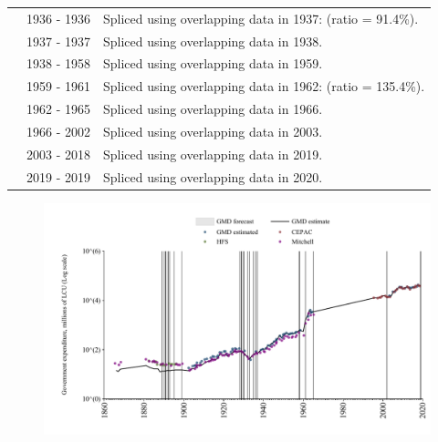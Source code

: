 \documentclass[12pt,a4paper,landscape]{article}
\begin{document}
\begin{adjustbox}{max totalsize={\paperwidth}{\paperheight},center}
\begin{minipage}[t][\textheight][t]{\textwidth}
\begin{table}[H]
\begin{tabular}{|l|l|l|}
\rowcolor{lightgray}\cite{GMD_estimated}& 1936 - 1936 &Spliced using overlapping data in 1937: (ratio = 91.4\%). \\
\rowcolor{white}\cite{Mitchell}& 1937 - 1937 &Spliced using overlapping data in 1938. \\
\rowcolor{lightgray}\cite{GMD_estimated}& 1938 - 1958 &Spliced using overlapping data in 1959. \\
\rowcolor{white}\cite{Mitchell}& 1959 - 1961 &Spliced using overlapping data in 1962: (ratio = 135.4\%). \\
\rowcolor{lightgray}\cite{GMD_estimated}& 1962 - 1965 &Spliced using overlapping data in 1966. \\
\rowcolor{white}\cite{CEPAC}& 1966 - 2002 &Spliced using overlapping data in 2003. \\
\rowcolor{lightgray}\cite{GMD_estimated}& 2003 - 2018 &Spliced using overlapping data in 2019. \\
\rowcolor{white}\cite{CEPAC}& 2019 - 2019 &Spliced using overlapping data in 2020. \\
\hline
\end{tabular}
\end{table}
\begin{figure}[H]
\centering
\includegraphics[width=\textwidth,height=0.6\textheight,keepaspectratio]{graphs/CUB_govexp.pdf}
\end{figure}
\end{minipage}
\end{adjustbox}
\end{document}
